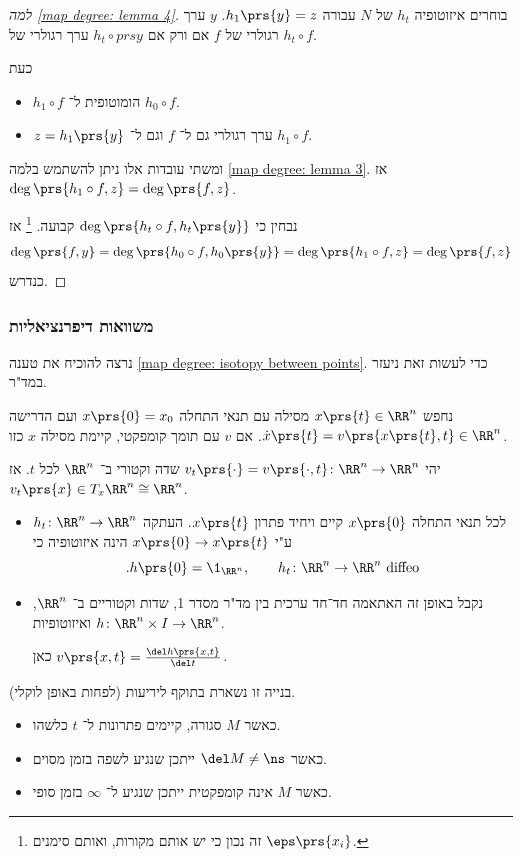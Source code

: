 \documentclass[a4paper,10pt,twoside,openany]{book}
\begin{document}
\begin{proof}[למה \ref{map degree: lemma 4}]
בוחרים איזוטופיה
$h_t$
של
$N$
עבורה
$h_1\prs{y} = z$.
$y$
ערך רגולרי של
$f$
אם ורק אם
$h_t\circ prs{y}$
ערך רגולרי של
$h_t\circ f$.

כעת
\begin{itemize}
\item $h_1 \circ f$
הומוטופית ל־%
$h_0 \circ f$.
\item $z = h_1\prs{y}$
ערך רגולרי גם ל־%
$f$
וגם ל־%
$h_1 \circ f$.
\end{itemize}
ומשתי עובדות אלו ניתן להשתמש בלמה
\ref{map degree: lemma 3}.
אז
$\deg\prs{h_1 \circ f, z} = \deg\prs{f,z}$.

נבחין כי
$\deg\prs{h_t\circ f, h_t\prs{y}}$
קבועה.%
\footnote{זה נכון כי יש אותם מקורות, ואותם סימנים
$\eps\prs{x_i}$.}
אז
\[\deg\prs{f,y} = \deg\prs{h_0 \circ f, h_0\prs{y}} = \deg\prs{h_1 \circ f, z} = \deg\prs{f,z}\]
כנדרש.
\end{proof}

\subsubsection{משוואות דיפרנציאליות}
נרצה להוכיח את טענה
\ref{map degree: isotopy between points}.
כדי לעשות זאת ניעזר במד"ר.

נחפש
$x\prs{t} \in \RR^n$
מסילה עם תנאי התחלה
$x\prs{0} = x_0$
ועם הדרישה
$\dot{x}\prs{t} = v\prs{x\prs{t}, t} \in \RR^n$.
אם
$v$
עם תומך קומפקטי, קיימת מסילה
$x$
כזו.

יהי
$v_t\prs{\cdot} = v\prs{\cdot,t} \colon \RR^n \to \RR^n$
שדה וקטורי ב־%
$\RR^n$
לכל
$t$.
אז
$v_t\prs{x} \in T_x\RR^n \cong \RR^n$.

\begin{itemize}
\item 
לכל תנאי התחלה
$x\prs{0}$
קיים ויחיד פתרון
$x\prs{t}$.
העתקה
$h_t\colon \RR^n \to \RR^n$
ע"י
$x\prs{0} \to x\prs{t}$
הינה איזוטופיה כי
\[\text{.} h\prs{0} = \1_{\RR^n}, \qquad h_t \colon \RR^n \to \RR^n \text{ diffeo}\]

\item
נקבל באופן זה האתאמה חד־חד ערכית בין
מד"ר מסדר 1, שדות וקטוריים ב־%
$\RR^n$,
ואיזוטופיות
$h \colon \RR^n \times I \to \RR^n$.

כאן
$v\prs{x,t} = \frac{\del h\prs{x,t}}{\del t}$.
\end{itemize}

\begin{remark}
בנייה זו נשארת בתוקף ליריעות (לפחות באופן לוקלי).

\begin{itemize}
\item
כאשר
$M$
סגורה, קיימים פתרונות ל־%
$t$
כלשהו.

\item
כאשר
$\del M \neq \ns$
ייתכן שנגיע לשפה בזמן מסוים.

\item כאשר
$M$
אינה קומפקטית ייתכן שנגיע ל־%
$\infty$
בזמן סופי.
\end{itemize}
\end{remark}
\end{document}
